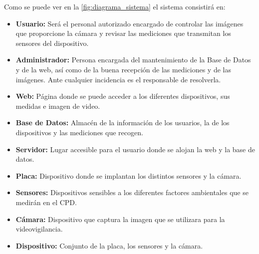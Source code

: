 \begin{figure}[H]
{}
\end{figure}

Como se puede ver en la \autoref{fig:diagrama_sistema} el sistema consistirá en:
\begin{itemize}
	\item \textbf{Usuario:} Será el personal autorizado encargado de controlar las imágenes que proporcione la cámara y revisar las mediciones que transmitan los sensores del dispositivo.
	\item \textbf{Administrador:} Persona encargada del mantenimiento de la Base de Datos y de la web, así como de la buena recepción de las mediciones y de las imágenes. Ante cualquier incidencia es el responsable de resolverla.
	\item \textbf{Web:} Página donde se puede acceder a los diferentes dispositivos, sus medidas e imagen de video.
	\item \textbf{Base de Datos:} Almacén de la información de los usuarios, la de los dispositivos y las mediciones que recogen.
	\item \textbf{Servidor:} Lugar accesible para el usuario donde se alojan la web y la base de datos.
	\item \textbf{Placa:} Dispositivo donde se implantan los distintos sensores y la cámara.
	\item \textbf{Sensores:} Dispositivos sensibles a los diferentes factores ambientales que se medirán en el CPD\@.
	\item \textbf{Cámara:} Dispositivo que captura la imagen que se utilizara para la videovigilancia.
	\item \textbf{Dispositivo:} Conjunto de la placa, los sensores y la cámara.
\end{itemize}

